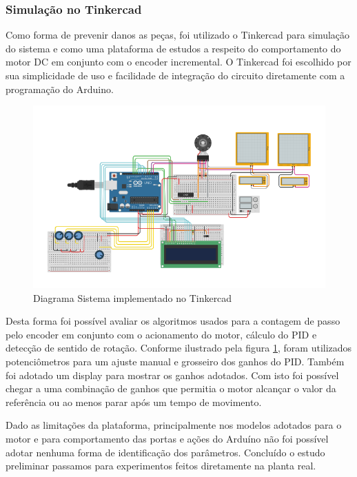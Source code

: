 \documentclass[a4paper,11pt]{article}
\begin{document}
\subsubsection{Simulação no Tinkercad}

Como forma de prevenir danos as peças, foi utilizado o Tinkercad para simulação do sistema e como uma plataforma de estudos a respeito do comportamento do motor DC em conjunto com o encoder incremental. O Tinkercad foi escolhido por sua simplicidade de uso e facilidade de integração do circuito diretamente com a programação do Arduino.

\begin{figure}[H]
    \centering
    \includegraphics[width=\linewidth]{src/tex/img/pid_tinkercad.png}
    \caption{Diagrama Sistema implementado no Tinkercad}
    \label{fig:pid_tinkercad}
\end{figure}

Desta forma foi possível avaliar os algoritmos usados para a contagem de passo pelo encoder em conjunto com o acionamento do motor, cálculo do PID e detecção de sentido de rotação. Conforme ilustrado pela figura \ref{fig:pid_tinkercad}, foram utilizados potenciômetros para um ajuste manual e grosseiro dos ganhos do PID. Também foi adotado um display para mostrar os ganhos adotados. Com isto foi possível chegar a uma combinação de ganhos que permitia o motor alcançar o valor da referência ou ao menos parar após um tempo de movimento.

Dado as limitações da plataforma, principalmente nos modelos adotados para o motor e para comportamento das portas e ações do Arduíno não foi possível adotar nenhuma forma de identificação dos parâmetros. Concluído o estudo preliminar passamos para experimentos feitos diretamente na planta real.
\end{document}
